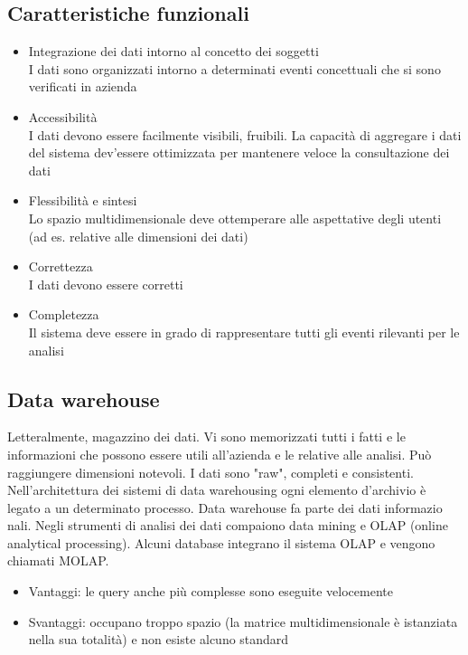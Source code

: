 \subsection{Caratteristiche
funzionali}\label{caratteristiche-funzionali}

\begin{itemize}

\item
  Integrazione dei dati intorno al concetto dei soggetti\\
  I dati sono organizzati intorno a determinati eventi concettuali che
  si sono verificati in azienda
\item
  Accessibilit\`a\\
  I dati devono essere facilmente visibili, fruibili. La capacit\`a di
  aggregare i dati del sistema dev'essere ottimizzata per mantenere
  veloce la consultazione dei dati
\item
  Flessibilit\`a e sintesi\\
  Lo spazio multidimensionale deve ottemperare alle aspettative degli
  utenti (ad es. relative alle dimensioni dei dati)
\item
  Correttezza\\
  I dati devono essere corretti
\item
  Completezza\\
  Il sistema deve essere in grado di rappresentare tutti gli eventi
  rilevanti per le analisi
\end{itemize}

\subsection{Data warehouse}\label{data-warehouse}

Letteralmente, magazzino dei dati. Vi sono memorizzati tutti i fatti e
le informazioni che possono essere utili all'azienda e le relative alle analisi.
Pu\`o raggiungere dimensioni notevoli. I dati sono "raw", completi e consistenti.\\
Nell'architettura dei sistemi di data warehousing ogni elemento
d'archivio \`e legato a un determinato processo. Data warehouse fa parte
dei dati informazio\- nali. Negli strumenti di analisi dei dati compaiono
data mining e OLAP (online analytical processing). Alcuni database integrano il sistema OLAP e vengono chiamati MOLAP.

\begin{itemize}

\item
  Vantaggi: le query anche pi\`u complesse sono eseguite velocemente
\item
  Svantaggi: occupano troppo spazio (la matrice multidimensionale \`e
  istanziata nella sua totalit\`a) e non esiste alcuno standard
\end{itemize}


